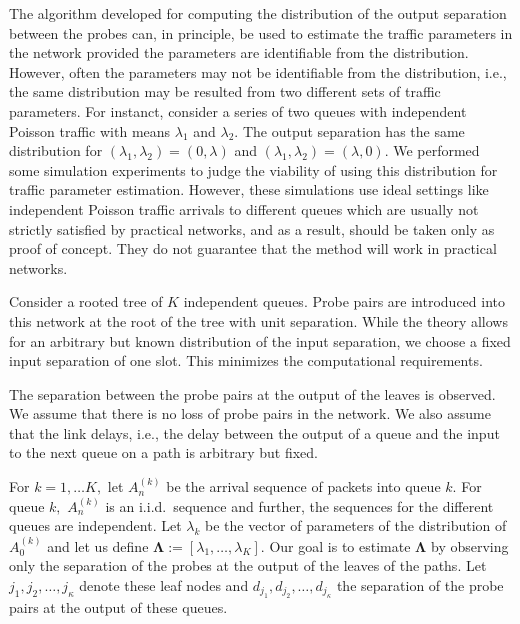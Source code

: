 \documentclass[11pt]{article}
\begin{document}
The algorithm developed for computing the distribution of the output
separation between the probes can, in principle, be used to estimate
the traffic parameters in the network provided the parameters are
identifiable from the distribution. However, often the parameters may
not be identifiable from the distribution, i.e., the same distribution
may be resulted from two different sets of traffic parameters. For
instanct, consider a series of two queues with independent Poisson
traffic with means $\lambda_1$ and $\lambda_2$. The output separation
has the same distribution for $(\lambda_1, \lambda_2) = (0,\lambda)$
and $(\lambda_1, \lambda_2) = (\lambda, 0)$. We performed some
simulation experiments to judge the viability of using this
distribution for traffic parameter estimation.  However, these
simulations use ideal settings like independent Poisson traffic
arrivals to different queues which are usually not strictly satisfied
by practical networks, and as a result, should be taken only as proof
of concept.  They do not guarantee that the method will work in
practical networks.

Consider a rooted tree of $K$ independent queues. Probe pairs are
introduced into this network at the root of the tree with unit
separation.  While the theory allows for an arbitrary but known
distribution of the input separation, we choose a fixed input
separation of one slot. This minimizes the computational requirements.

The separation between the probe pairs at the output of the leaves is
observed. We assume that there is no loss of probe pairs in the
network. We also assume that the link delays, i.e., the delay between
the output of a queue and the input to the next queue on a path is
arbitrary but fixed.

For $k=1,\ldots K,$ let $A^{(k)}_n$ be the arrival sequence of packets
into queue $k.$ For queue $k,$ $A^{(k)}_n$ is an i.i.d.~sequence and
further, the sequences for the different queues are independent.  Let
$\lambda_k$ be the vector of parameters of the distribution of
$A_0^{(k)}$ and let us define $\mathbf{\Lambda}:=[\lambda_1, \ldots,
\lambda_K].$ Our goal is to estimate $\mathbf{\Lambda}$ by observing
only the separation of the probes at the output of the leaves of the
paths.  Let $j_1, j_2, \ldots, j_{\kappa}$ denote these leaf nodes and
$d_{j_1},d_{j_2}, \ldots, d_{j_\kappa}$ the separation of the probe
pairs at the output of these queues.
\end{document}
